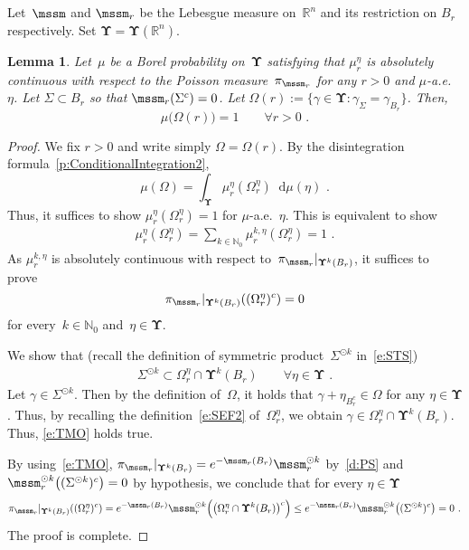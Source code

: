 \documentclass[11pt,letterpaper]{amsart}
\newcommand{\diff}{\mathop{}\!\mathrm{d}}
\newcommand{\N}{{\mathbb N}}
\newcommand{\R}{{\mathbb R}}
\newcommand{\fstop}{\,\,\mathrm{.}}
\newcommand{\QP}{{\mu}}
\newcommand{\dUpsilon}{{\mathbf \Upsilon}}
\newcommand{\U}{\dUpsilon}
\renewcommand{\1}{\mathbf 1}
\numberwithin{equation}{section}
\theoremstyle{plain}
\newtheorem{lem}[thm]{Lemma}%
\theoremstyle{definition}
\theoremstyle{remark}
\begin{document}
\begin{appendix}
\section{}
Let~$\mssm$ and $\mssm_r$ be the Lebesgue measure on~$\R^n$ and its restriction on $B_r$ respectively. Set $\U=\U(\R^n)$. 
\begin{lem} \label{l:WDG}
Let~$\QP$ be a Borel probability on~$\U$ satisfying that $\QP_r^\eta$ is absolutely continuous with respect to the Poisson measure~$\pi_{\mssm_r}$ for any $r>0$ and $\QP$-a.e.~$\eta$. Let $\Sigma \subset B_r$ so that $\mssm_r(\Sigma^c)=0$. Let $\Omega(r):=\{\gamma \in \U: \gamma_\Sigma=\gamma_{B_r}\}$. Then, 
$$\QP\bigl(\Omega(r)\bigr)=1 \qquad \forall r>0 \fstop$$
\end{lem}
\begin{proof}
We fix $r>0$ and write simply $\Omega=\Omega(r)$.
By the disintegration formula~\eqref{p:ConditionalIntegration2}, 
$$\QP(\Omega)=\int_{\U} \QP_r^\eta(\Omega_r^\eta) \diff \QP(\eta) \fstop$$
Thus, it suffices to show $\QP_r^\eta(\Omega_r^\eta)=1$ for $\QP$-a.e.~$\eta$. This is equivalent to show 
\begin{align} \label{e:NMP}
\QP_r^\eta(\Omega_r^\eta)=\sum_{k \in \N_0}\QP_r^{k, \eta}(\Omega_r^\eta)=1 \fstop
\end{align}
As $\QP_r^{k, \eta}$ is absolutely continuous with respect to~$\pi_{\mssm_r}|_{\U^k(B_r)}$, 
it suffices to prove 
$$\pi_{\mssm_r}|_{\U^k(B_r)}((\Omega_r^\eta)^c)=0$$ for every~$k \in \N_0$ and~$\eta \in \U$.

We show that (recall the definition of symmetric product~$\Sigma^{\odot k}$ in~\eqref{e:STS})
\begin{align} \label{e:TMO}
\Sigma^{\odot k} \subset \Omega_r^\eta \cap \U^k(B_r)  \qquad \forall \eta \in \U \fstop
\end{align}
Let $\gamma \in \Sigma^{\odot k}$. Then by the definition of~$\Omega$, it holds that $\gamma+\eta_{B_r^c} \in \Omega$ for any $\eta \in \U$. Thus, by recalling the definition~\eqref{e:SEF2} of~$\Omega_r^\eta$, we obtain $\gamma \in \Omega_r^\eta \cap \U^k(B_r)$. Thus, \eqref{e:TMO} holds true. 

By using~\eqref{e:TMO}, $\pi_{\mssm_r}|_{\U^k(B_r)}=e^{-\mssm_r(B_r)}\mssm_r^{\odot k}$ by~\eqref{d:PS} and $\mssm_r^{\odot k}\bigl((\Sigma^{\odot k})^c\bigr)=0$ by hypothesis, we conclude that for every $\eta \in \U$
$$\pi_{\mssm_r}|_{\U^k(B_r)}((\Omega_r^\eta)^c) = e^{-\mssm_r(B_r)}\mssm_r^{\odot k}\Bigl(\bigl(\Omega_r^\eta\cap \U^k(B_r)\bigl)^c\Bigr) \le  e^{-\mssm_r(B_r)}\mssm_r^{\odot k}\bigl((\Sigma^{\odot k})^c\bigr)=0 \fstop$$
The proof is complete.
\end{proof}


\end{appendix}
\end{document}
